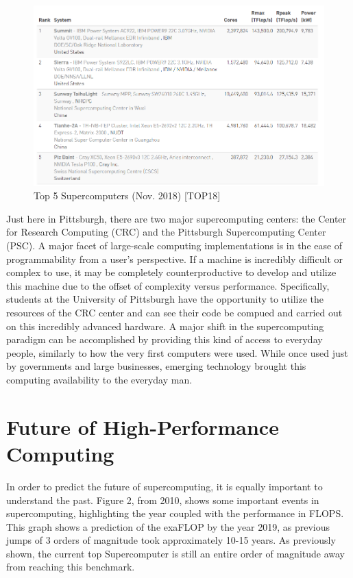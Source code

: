 \documentclass[12pt, letterpaper]{article}
\begin{document}
\begin{figure}[H]
	\includegraphics[width=\linewidth]{top5.png}
	\caption{Top 5 Supercomputers (Nov. 2018) [TOP18]}
\end{figure}


Just here in Pittsburgh, there are two major supercomputing centers: the Center for Research Computing (CRC) and the Pittsburgh Supercomputing Center (PSC). A major facet of large-scale computing implementations is in the ease of programmability from a user’s perspective. If a machine is incredibly difficult or complex to use, it may be completely counterproductive to develop and utilize this machine due to the offset of complexity versus performance. Specifically, students at the University of Pittsburgh have the opportunity to utilize the resources of the CRC center and can see their code be compued and carried out on this incredibly advanced hardware. A major shift in the supercomputing paradigm can be accomplished by providing this kind of access to everyday people, similarly to how the very first computers were used. While once used just by governments and large businesses, emerging technology brought this computing availability to the everyday man.

\section{Future of High-Performance Computing}

In order to predict the future of supercomputing, it is equally important to understand the past. Figure 2, from 2010, shows some important events in supercomputing, highlighting the year coupled with the performance in FLOPS. This graph shows a prediction of the exaFLOP by the year 2019, as previous jumps of 3 orders of magnitude took approximately 10-15 years. As previously shown, the current top Supercomputer is still an entire order of magnitude away from reaching this benchmark.
\end{document}

